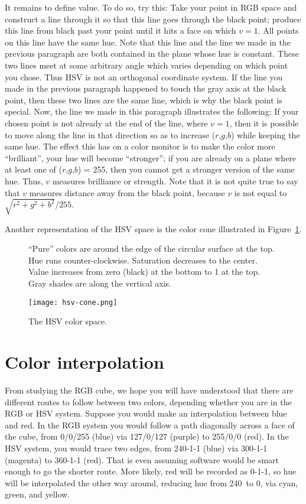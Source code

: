 It remains to define value. To do so, try this:
Take your point in RGB space and construct a line through it so that
this line goes through the black point; produce this line from black
past your point until it hits a face on which $v = 1$.  All points
on this line have the same hue.  Note that this line and the line we
made in the previous paragraph are both contained in the plane whose
hue is constant.  These two lines meet at some arbitrary
angle which varies depending on which point you chose.  Thus HSV is
not an orthogonal coordinate system.  If the line you made in the
previous paragraph happened to touch the gray axis at the black point,
then these two lines are the same line, which is why the black point
is special.  Now, the line we made in this paragraph illustrates the
following:  If your chosen point is not already at the end of the
line, where $v = 1$, then it is possible to move along the line in
that direction so as to increase ($r$,$g$,$b$) while keeping the
same hue.  The effect this has on a color monitor is to make the
color more ``brilliant'', your hue will become ``stronger''; if you are already on a plane where
at least one of ($r$,$g$,$b$) = 255, then you cannot get a stronger
version of the same hue.  Thus, $v$ measures brilliance or strength.  Note that
it is not quite true to say that $v$ measures distance away from
the black point, because $v$ is not equal to $\sqrt{r^2 + g^2 + b^2}/255$.

Another representation of the HSV space is the color cone illustrated in Figure~\ref{fig:hsv-cone}.

\begin{figure}[h]
   \parbox[b]{0.54\textwidth}{``Pure'' colors are around the edge of the circular surface at the top. Hue runs counter-clockwise. Saturation decreases to the center. Value increases from zero (black) at the bottom to 1 at the top. Gray shades are along the vertical axis.}%
   \hfill%
   \texttt{[image: hsv-cone.png]}%
   \caption{The HSV color space.}
   \label{fig:hsv-cone}
\end{figure}

\section{Color interpolation}
From studying the RGB cube, we hope you will have understood that there are different routes to follow between two colors, depending whether you are in the RGB or HSV system. Suppose you would make an interpolation between blue and red. In the RGB system you would follow a path diagonally across a face of the cube, from 0/0/255 (blue) via 127/0/127 (purple) to 255/0/0 (red). In the HSV system, you would trace two edges, from 240-1-1 (blue) via 300-1-1 (magenta) to 360-1-1 (red). That is even assuming software would be smart enough to go the shorter route. More likely, red will be recorded as 0-1-1, so hue will be interpolated the other way around, reducing hue from 240\DS\ to 0\DS, via cyan, green, and yellow.

